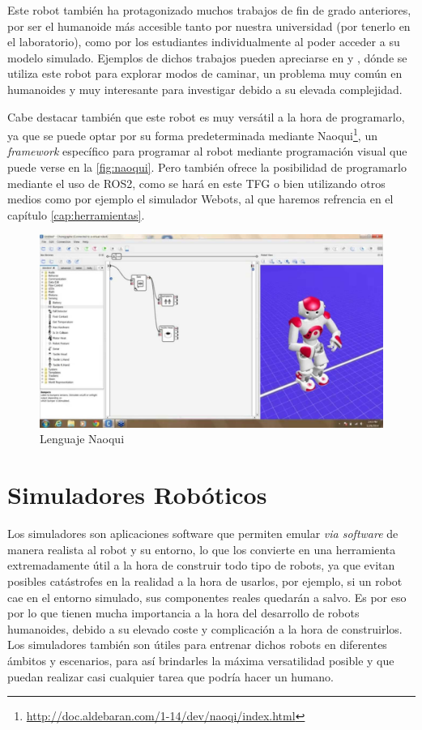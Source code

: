 Este robot también ha protagonizado muchos trabajos de fin de grado anteriores, por ser el humanoide más accesible tanto por nuestra universidad (por tenerlo en el laboratorio), como por los estudiantes individualmente al poder acceder a su modelo simulado. Ejemplos de dichos trabajos pueden apreciarse en \cite{tfg_caminata_nao} y  \cite{tfg_caminatas_ondas}, dónde se utiliza este robot para explorar  modos de caminar, un problema muy común en humanoides y muy interesante para investigar debido a su elevada complejidad.

Cabe destacar también que este robot es muy versátil a la hora de programarlo, ya que se puede optar por su forma predeterminada mediante Naoqui\footnote{\url{http://doc.aldebaran.com/1-14/dev/naoqi/index.html}}, un \textit{framework} específico para programar al robot mediante programación visual que puede verse en la \autoref{fig:naoqui}. Pero también ofrece la posibilidad de programarlo mediante el uso de ROS2, como se hará en este TFG o bien utilizando otros medios como por ejemplo el simulador Webots, al que haremos refrencia en el capítulo \ref{cap:herramientas}.

\begin{figure}[H]
    \centering
    \includegraphics[width=1\textwidth]{figures/cap_1/naoqui.jpg}
    \caption{Lenguaje Naoqui}
    \label{fig:naoqui}
\end{figure}

\section{Simuladores Robóticos}

Los simuladores son aplicaciones software que permiten emular \textit{via software} de manera realista al robot y su entorno, lo que los convierte en una herramienta extremadamente útil a la hora de construir todo tipo de robots, ya que evitan posibles catástrofes en la realidad a la hora de usarlos, por ejemplo, si un robot cae en el entorno simulado, sus componentes reales quedarán a salvo. Es por eso por lo que tienen mucha importancia a la hora del desarrollo de robots humanoides, debido a su elevado coste y complicación a la hora de construirlos. Los simuladores también son útiles para entrenar dichos robots en diferentes ámbitos y escenarios, para así brindarles la máxima versatilidad posible y que puedan realizar casi cualquier tarea que podría hacer un humano.

